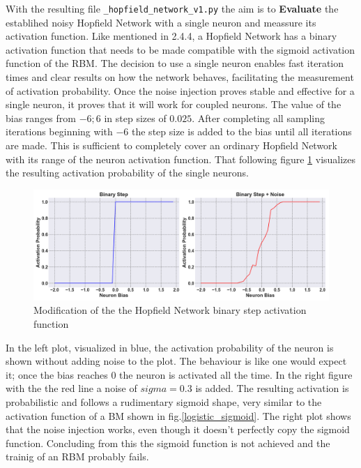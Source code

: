 With the resulting file \texttt{\_hopfield\_network\_v1.py} the aim is to \textbf{Evaluate} the establihed noisy Hopfield Network with a single neuron 
and meassure its activation function.
Like mentioned in 2.4.4, a Hopfield Network has a binary activation function that needs to be made compatible with the sigmoid activation function of the \ac{RBM}.
The decision to use a single neuron enables fast iteration times and clear results on how the network behaves, facilitating the measurement of activation probability.
Once the noise injection proves stable and effective for a single neuron, it proves that it will work for coupled neurons.
The value of the bias ranges from \(-6; 6\) in step sizes of \(0.025\). After completing all sampling iterations beginning with \(-6\) the step size is added to the bias until all iterations are made.
This is sufficient to completely cover an ordinary Hopfield Network with its range of the neuron activation function. 
That following figure \ref{Noisy_acitivation_function_bad} visualizes the resulting activation probability of the single neurons. 
\begin{figure}[H]
    \centering
    \includegraphics[width=1\linewidth]{graphics/combined_noise_activation_plots.png}
    \caption{Modification of the the Hopfield Network binary step activation function}
    \label{Noisy_acitivation_function_bad}
\end{figure}
In the left plot, visualized in blue, the activation probability of the neuron is shown without adding noise to the plot. 
The behaviour is like one would expect it; once the bias reaches 0 the neuron is activated all the time.
In the right figure with the the red line a noise of \(sigma=0.3\) is added.
The resulting activation is probabilistic and follows a rudimentary sigmoid shape, very similar to the activation function of a \ac{BM} shown in fig.\ref{logistic_sigmoid}.
The right plot shows that the noise injection works, even though it doesn't perfectly copy the sigmoid function.
Concluding from this the sigmoid function is not achieved and the trainig of an \ac{RBM} probably fails. 
